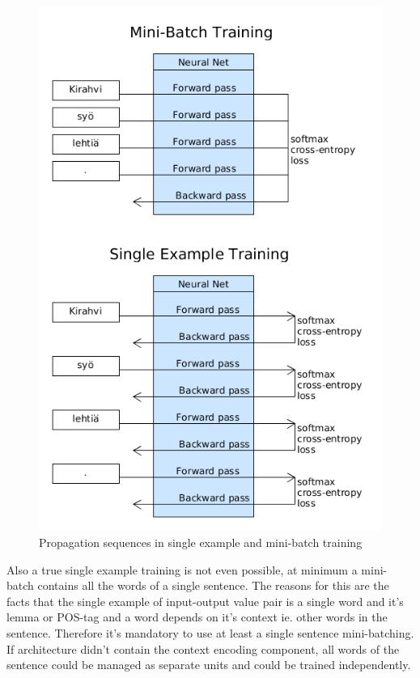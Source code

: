 \documentclass[12pt,a4paper,english
]{tutthesis}
\begin{document}
\begin{figure}[htbp]
\caption{Propagation sequences in single example and mini-batch training}
\label{figure:single_vs_batch}
\centering
\includegraphics[width=12cm]{single_vs_batch.png}
\end{figure}

Also a true single example training is not even possible, at minimum a mini-batch contains all the words of a single sentence. The reasons for this are the facts that the single example of input-output value pair is a single word and it's lemma or POS-tag and a word depends on it's context ie. other words in the sentence. Therefore it's mandatory to use at least a single sentence mini-batching. If architecture didn't contain the context encoding component, all words of the sentence could be managed as separate units and could be trained independently.
\end{document}
